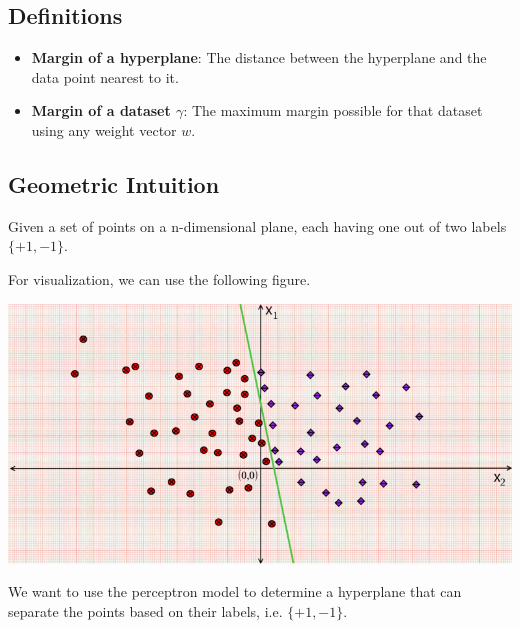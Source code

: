 \documentclass{report}
\begin{document}
\subsection{Definitions}
\begin{itemize}
  \item \textbf{Margin of a hyperplane}: The distance between the hyperplane and the data point nearest to it.
  \item \textbf{Margin of a dataset $\gamma$}: The maximum margin possible for that dataset using any weight vector $w$.
\end{itemize}

\subsection{Geometric Intuition}
Given a set of points on a n-dimensional plane, each having one out of two labels $\{+1,-1\}$.

\noindent For visualization, we can use the following figure.
\begin{center}
  \includegraphics[scale=0.4]{"images/perc-01.png"}
\end{center}

\noindent We want to use the perceptron model to determine a hyperplane that can separate the points based on their labels, i.e. $\{+1,-1\}$.
\end{document}
